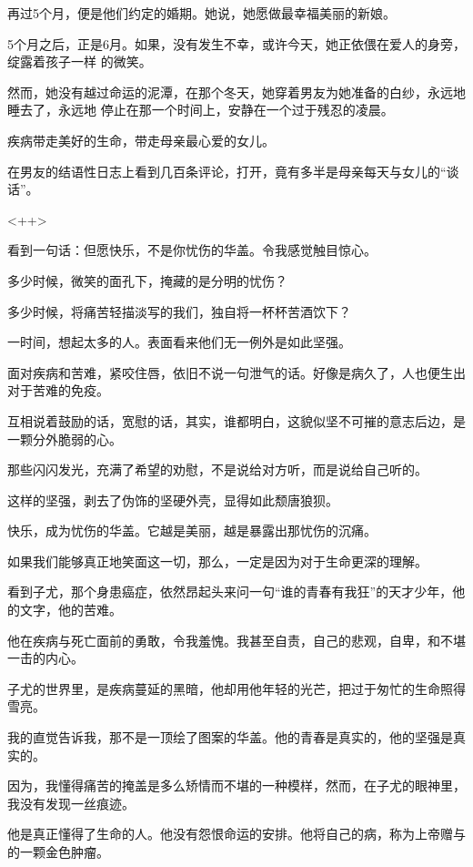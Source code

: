 \documentclass[12pt,a4paper]{article}
\begin{document}
		再过5个月，便是他们约定的婚期。她说，她愿做最幸福美丽的新娘。

		5个月之后，正是6月。如果，没有发生不幸，或许今天，她正依偎在爱人的身旁，绽露着孩子一样
	的微笑。

		然而，她没有越过命运的泥潭，在那个冬天，她穿着男友为她准备的白纱，永远地睡去了，永远地
	停止在那一个时间上，安静在一个过于残忍的凌晨。

		疾病带走美好的生命，带走母亲最心爱的女儿。

		在男友的结语性日志上看到几百条评论，打开，竟有多半是母亲每天与女儿的“谈话”。

	<++>
	\endwriting



		看到一句话：但愿快乐，不是你忧伤的华盖。令我感觉触目惊心。

		多少时候，微笑的面孔下，掩藏的是分明的忧伤？

		多少时候，将痛苦轻描淡写的我们，独自将一杯杯苦酒饮下？

		一时间，想起太多的人。表面看来他们无一例外是如此坚强。

		面对疾病和苦难，紧咬住唇，依旧不说一句泄气的话。好像是病久了，人也便生出对于苦难的免疫。

		互相说着鼓励的话，宽慰的话，其实，谁都明白，这貌似坚不可摧的意志后边，是一颗分外脆弱的心。

		那些闪闪发光，充满了希望的劝慰，不是说给对方听，而是说给自己听的。

		这样的坚强，剥去了伪饰的坚硬外壳，显得如此颓唐狼狈。

		快乐，成为忧伤的华盖。它越是美丽，越是暴露出那忧伤的沉痛。

		如果我们能够真正地笑面这一切，那么，一定是因为对于生命更深的理解。

		看到子尤，那个身患癌症，依然昂起头来问一句“谁的青春有我狂”的天才少年，他的文字，他的苦难。

		他在疾病与死亡面前的勇敢，令我羞愧。我甚至自责，自己的悲观，自卑，和不堪一击的内心。

		子尤的世界里，是疾病蔓延的黑暗，他却用他年轻的光芒，把过于匆忙的生命照得雪亮。

		我的直觉告诉我，那不是一顶绘了图案的华盖。他的青春是真实的，他的坚强是真实的。

		因为，我懂得痛苦的掩盖是多么矫情而不堪的一种模样，然而，在子尤的眼神里，我没有发现一丝痕迹。

		他是真正懂得了生命的人。他没有怨恨命运的安排。他将自己的病，称为上帝赠与的一颗金色肿瘤。
\end{document}
